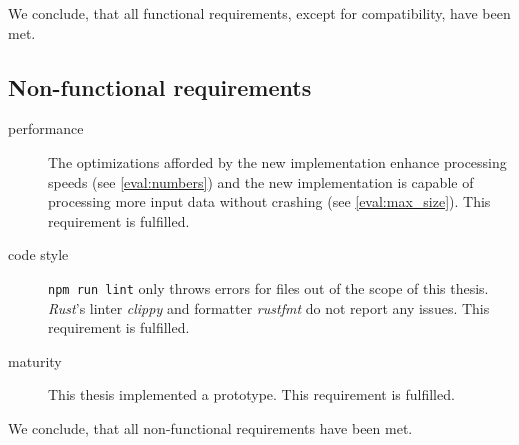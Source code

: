 We conclude, that all functional requirements, except for compatibility, have been met.

\subsection{Non-functional requirements}
\begin{description}
	\item[performance] The optimizations afforded by the new implementation enhance processing speeds (see \autoref{eval:numbers}) and the new implementation is capable of processing more input data without crashing (see \autoref{eval:max_size}).
	      This requirement is fulfilled.
	\item[code style] \Verb|npm run lint| only throws errors for files out of the scope of this thesis.
	      \emph{Rust}'s linter \emph{clippy} and formatter \emph{rustfmt} do not report any issues.
	      This requirement is fulfilled.
	\item[maturity] This thesis implemented a prototype.
	      This requirement is fulfilled.
\end{description}

We conclude, that all non-functional requirements have been met.
